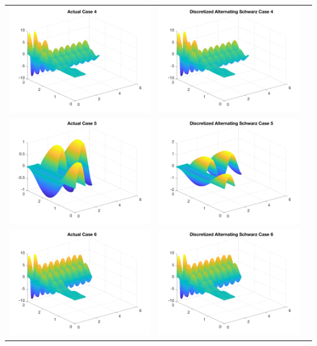 \documentclass[11pt]{article}
\theoremstyle{definition}
\theoremstyle{remark}
\theoremstyle{plain}
\begin{document}
\begin{center}
\begin{tabular}{ccc}
    \includegraphics[width=0.3\linewidth]{../Figures/final_4_actual_4.png}&\includegraphics[width=0.3\linewidth]{../Figures/final_4_add_4.png}&\\
    \includegraphics[width=0.3\linewidth]{../Figures/final_4_actual_5.png}&\includegraphics[width=0.3\linewidth]{../Figures/final_4_add_5.png}&\\
    \includegraphics[width=0.3\linewidth]{../Figures/final_4_actual_6.png}&\includegraphics[width=0.3\linewidth]{../Figures/final_4_add_6.png}&
  \end{tabular}
\end{center}
\end{document}
